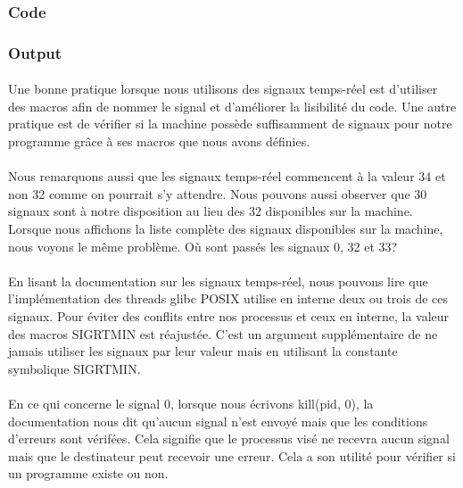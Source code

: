 \documentclass{article}
\begin{document}
\subsubsection*{Code}



\subsubsection*{Output}



\paragraph{} Une bonne pratique lorsque nous utilisons des signaux temps-réel est d'utiliser des macros afin de nommer le signal et d'améliorer la lisibilité du code.
Une autre pratique est de vérifier si la machine possède suffisamment de signaux pour notre programme grâce à ses macros que nous avons définies. 

\paragraph{} Nous remarquons aussi que les signaux temps-réel commencent à la valeur 34 et non 32 comme on pourrait s'y attendre. 
Nous pouvons aussi observer que 30 signaux sont à notre disposition au lieu des 32 disponibles sur la machine. 
Lorsque nous affichons la liste complète des signaux disponibles sur la machine, nous voyons le même problème. Où sont passés les signaux 0, 32 et 33?



\paragraph{} En lisant la documentation sur les signaux temps-réel, nous pouvons lire que l'implémentation des threads glibc POSIX utilise en interne deux ou trois de ces signaux.
Pour éviter des conflits entre nos processus et ceux en interne, la valeur des macros SIGRTMIN est réajustée. C'est un argument supplémentaire de ne jamais utiliser les signaux 
par leur valeur mais en utilisant la constante symbolique SIGRTMIN.

\paragraph{} En ce qui concerne le signal 0, lorsque nous écrivons kill(pid, 0), la documentation nous dit qu'aucun signal n'est envoyé mais que les conditions d'erreurs sont vérifées.
Cela signifie que le processus visé ne recevra aucun signal mais que le destinateur peut recevoir une erreur. Cela a son utilité pour vérifier si un programme existe ou non.
\end{document}
